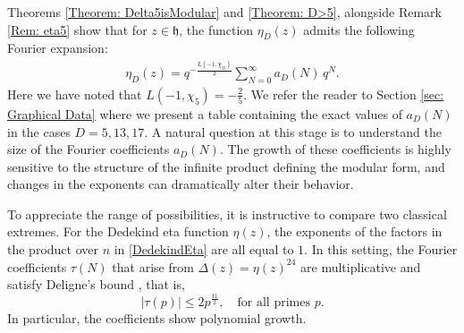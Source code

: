 \documentclass[11pt]{amsart}
\numberwithin{equation}{section}
\theoremstyle{remark}
\begin{document}
Theorems \ref{Theorem: Delta5isModular} and \ref{Theorem: D>5}, alongside Remark \ref{Rem: eta5} show that for $z \in \mathfrak{h}$, the function $\eta_{D}(z)$ admits the following Fourier expansion:
\begin{align}\label{Fourier Coefficients Definition}
\eta_{D}(z) = q^{-\frac{L(-1,\chi_{D})}{2}} \sum_{N=0}^{\infty} a_{D}(N) \,  q^{N}.
\end{align}
Here we have noted that $L(-1,\chi_5) = -\frac{2}{5}$. We refer the reader to Section \ref{sec: Graphical Data} where we present a table containing the exact values of \(a_{D}(N)\) in the cases \(D = 5, 13, 17\). A natural question at this stage is to understand the size of the Fourier coefficients $a_{D}(N)$. The growth of these coefficients is highly sensitive to the structure of the infinite product defining the modular form, and changes in the exponents can dramatically alter their behavior.

To appreciate the range of possibilities, it is instructive to compare two classical extremes. For the Dedekind eta function $\eta(z)$, the exponents of the factors in the product over $n$ in \eqref{DedekindEta} are all equal to $1$. In this setting, the Fourier coefficients $\tau(N)$ that arise from $\Delta(z) = \eta(z)^{24}$ are multiplicative and satisfy Deligne's bound \cite{Deligne74}, that is, 
\[
 \lvert \tau(p) \rvert  \leq 2 p^{\frac{11}{2}}, \quad \textrm{for all primes } p.
\] 
In particular, the coefficients show polynomial growth.
\end{document}
